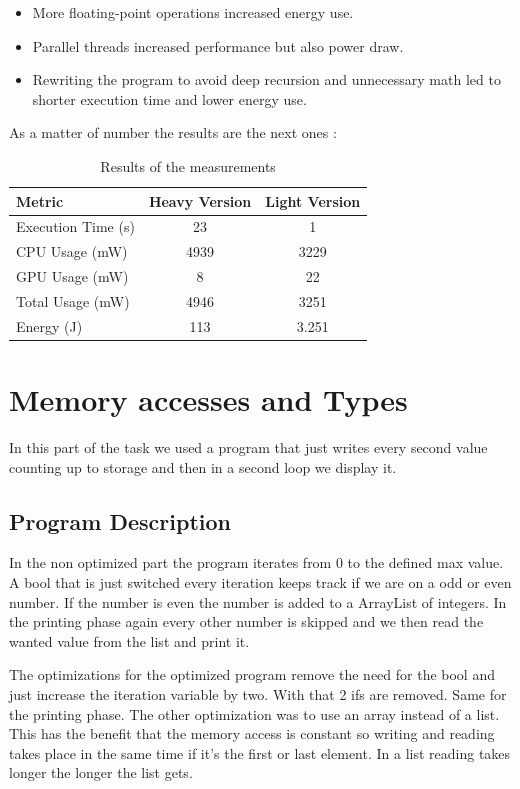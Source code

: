\documentclass[twocolumn,10pt]{article}
\begin{document}
\begin{itemize}
    \item More floating-point operations increased energy use.
    \item Parallel threads increased performance but also power draw.
    \item Rewriting the program to avoid deep recursion and unnecessary math led to shorter execution time and lower energy use.
\end{itemize}

As a matter of number the results are the next ones :
\begin{table}[h!]
    \centering
    \begin{tabular}{|l|c|c|}
        \hline
        \textbf{Metric} & \textbf{Heavy Version} & \textbf{Light Version} \\
        \hline
        Execution Time (s)  & 23    & 1     \\
        CPU Usage (mW)      & 4939  & 3229  \\
        GPU Usage (mW)      & 8     & 22    \\
        Total Usage (mW)    & 4946  & 3251  \\
        Energy (J)          & 113   & 3.251 \\
        \hline
    \end{tabular}
    \caption{Results of the measurements}
\end{table}

\section{Memory accesses and Types}
In this part of the task we used a program that just writes every second value counting up to storage and then in a second loop we display it.

\subsection{Program Description}
In the non optimized part the program iterates from 0 to the defined max value. A bool that is just switched every iteration keeps track if we are on a odd or even number. If the number is even the number is added to a ArrayList of integers.
In the printing phase again every other number is skipped and we then read the wanted value from the list and print it.

The optimizations for the optimized program remove the need for the bool and just increase the iteration variable by two. With that 2 ifs are removed. Same for the printing phase.
The other optimization was to use an array instead of a list. This has the benefit that the memory access is constant so writing and reading takes place in the same time if it's the first or last element.
In a list reading takes longer the longer the list gets.
\end{document}
